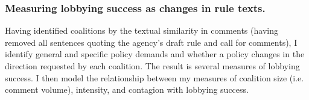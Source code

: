 



\subsubsection{Measuring lobbying success as changes in rule texts.}

Having identified coalitions by the textual similarity in comments (having removed all sentences quoting the agency's draft rule and call for comments), I identify general and specific policy demands and whether a policy changes in the direction requested by each coalition. The result is several measures of lobbying success. I then model the relationship between my measures of coalition size (i.e. comment volume), intensity, and contagion with lobbying success.


